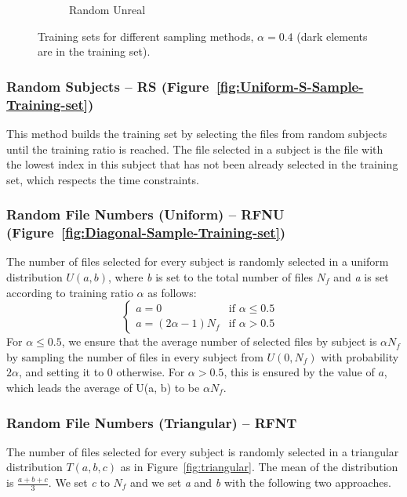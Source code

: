 \documentclass[10pt, conference, compsocconf]{IEEEtran}
\begin{document}
\begin{figure}[h!]
\begin{subfigure}[b]{\columnwidth}
                  \caption{Random Unreal}
                  \label{fig:Random-Unreal-Sample-Training-set}
        \end{subfigure}
        \caption{Training sets for different sampling methods, $\alpha=0.4$ (dark elements are in the training set).}
        \label{fig:sampling}
\end{figure}

\subsubsection{Random Subjects -- RS 
(Figure~\ref{fig:Uniform-S-Sample-Training-set})} This method builds 
the training set by selecting the files from random subjects until the 
training ratio is reached. The file selected in a subject is the file 
with the lowest index in this subject that has not been already 
selected in the training set, which respects the time constraints.

\subsubsection{Random File Numbers (Uniform) -- RFNU (Figure~\ref{fig:Diagonal-Sample-Training-set})}
The number of files selected for every subject is randomly selected in
a uniform distribution $U(\textit{a},\textit{b})$, where \textit{b} is set to the total
number of files $N_{f}$ and \textit{a} is set according to training ratio $\alpha$ as follows:
\[
  \begin{cases}
          \textit{a} = 0      & \text{if $\alpha \leq 0.5$ }\\
          
          \textit{a} = (2\alpha - 1) N_{f} & \text{if $\alpha > 0.5$}
  \end{cases}
\]
 For $\alpha \leq 0.5$, we ensure that the average number of selected 
 files by subject is $\alpha N_f$ by sampling the number of 
 files in every subject from $U(0,N_f)$ with 
 probability $2\alpha$, and setting it to 0 otherwise. For $\alpha > 
 0.5$, this is ensured by the value of $a$, which leads the 
 average of U(a, b) to be $\alpha N_f$.

\subsubsection{Random File Numbers (Triangular) -- RFNT}
The number of files selected for every subject is randomly selected in
a triangular distribution $T(a, b, c)$ as in Figure~\ref{fig:triangular}. The mean of the distribution is 
$\frac{a+b+c}{3}$. We set \textit{c} to $N_{f}$ and we set 
\textit{a} and \textit{b} with the following two approaches.
\end{document}

